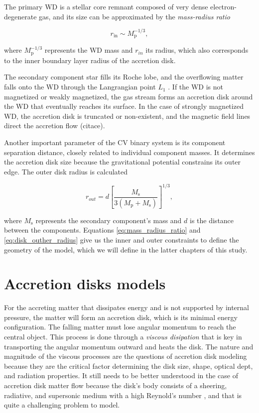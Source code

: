     The primary WD is a stellar core remnant composed of very dense electron-degenerate gas, and its size can be approximated by the \emph{mass-radius ratio} \cite{shapiro1983}

    \begin{equation}
        r_{\textrm{in}} \sim M^{-1/3}_{\textrm{p}},
        \label{eq:mass_radius_ratio}
    \end{equation}

    where $M^{-1/3}_{\textrm{p}}$ represents the WD mass and $r_{in}$ its radius, which also corresponds to the inner boundary layer radius of the accretion disk.

    The secondary component star fills its Roche lobe, and the overflowing matter falls onto the WD through the Langrangian point $L_1$ \cite{warner1995}. If the WD is not magnetized or weakly magnetized, the gas stream forms an accretion disk around the WD that eventually reaches its surface. In the case of strongly magnetized WD, the accretion disk is truncated or non-existent, and the magnetic field lines direct the accretion flow (citace). 

    Another important parameter of the CV binary system is its component separation distance, closely related to individual component masses. It determines the accretion disk size because the gravitational potential constrains its outer edge. The outer disk radius is calculated


    \begin{equation}
        r_{out} = d \left[ \frac{M_{\textrm{s}}}{3(M_{\textrm{p}}+M_{\textrm{s}})} \right]^{1/3},
        \label{eq:disk_outher_radius}
    \end{equation}

    where $M_{\textrm{s}}$ represents the secondary component's mass and $d$ is the distance between the components. Equations \eqref{eq:mass_radius_ratio} and \eqref{eq:disk_outher_radius} give us the inner and outer constraints to define the geometry of the model, which we will define in the latter chapters of this study.   

\section{Accretion disks models}
    For the accreting matter that dissipates energy and is not supported by internal pressure, the matter will form an accretion disk, which is its minimal energy configuration. The falling matter must lose angular momentum to reach the central object. This process is done through a \emph{viscous disipation} that is key in transporting the angular momentum outward and heats the disk. The nature and magnitude of the viscous processes are the questions of accretion disk modeling because they are the critical factor determining the disk size, shape, optical dept, and radiation properties. It still needs to be better understood in the case of accretion disk matter flow because the disk's body consists of a sheering, radiative, and supersonic medium with a high Reynold's number \cite{pringle1981}, and that is quite a challenging problem to model. 

